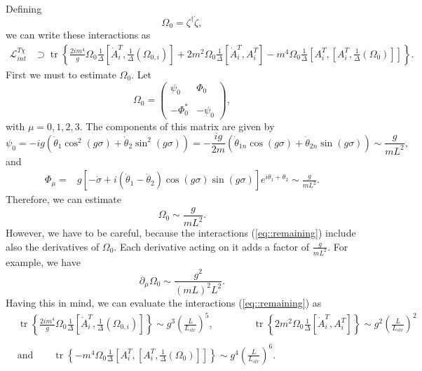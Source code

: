 \documentclass{article}
\DeclareMathOperator{\tr}{tr}
\begin{document}
Defining 
\begin{equation}
    \Omega_0=\zeta^{\dagger}\dot{\zeta},
\end{equation}
we can write these interactions as
\begin{equation}\label{eq::remaining}
\begin{split}
    \mathcal{L}^{T\chi}_{int}&\supset\tr\left\{\frac{2im^4}{g}\Omega_0\frac{1}{\Delta}\left[\dot{A}_i^T,\frac{1}{\Delta}\left(\Omega_{0,i}\right)\right]+2m^2\Omega_0\frac{1}{\Delta}\left[\dot{A}_i^T,A_i^T\right]-m^4\Omega_0\frac{1}{\Delta}\left[A_i^T,\left[A_i^T,\frac{1}{\Delta}\left(\Omega_0\right)\right]\right]\right\}.
    \end{split}
\end{equation}
First we must to estimate $\Omega_{0}$. Let
\begin{equation}
    \Omega_{0}=\begin{pmatrix}
     \psi_{0} & \Phi_{0} \\\\
     -\Phi_{0}^* & -\psi_{0} 
\end{pmatrix},
\end{equation}
with $\mu=0,1,2,3$. The components of this matrix are given by  
\begin{equation}
    \psi_{0}=-ig(\dot{\theta}_1\cos^2(g\sigma)+\dot{\theta}_2\sin^2(g\sigma))=-\frac{ig}{2m}(\dot{\theta}_{1n}\cos(g\sigma)+\dot{\theta}_{2n}\sin(g\sigma))\sim\frac{g}{mL^2},
\end{equation}
and
\begin{equation}
    \begin{split}
        \Phi_{\mu}=&g[-\dot{\sigma}+i(\dot{\theta}_1-\dot{\theta}_2)\cos(g\sigma)\sin(g\sigma)]e^{i\theta_1+\theta_2}\sim\frac{g}{mL^2}.
    \end{split}
\end{equation}
Therefore, we can estimate 
\begin{equation}
    \Omega_{0}\sim\frac{g}{mL^2}.
\end{equation}
However, we have to be careful, because the interactions (\ref{eq::remaining}) include also the derivatives of $\Omega_{0}$.
Each derivative acting on it adds a factor of $\frac{g}{mL^2}$. For example, we have
\begin{equation}
    \partial_{\mu}\Omega_0\sim\frac{g^2}{\left(mL\right)^2L^2}.
\end{equation}
 Having this in mind, we can evaluate the interactions (\ref{eq::remaining}) as 
 \begin{equation}
 \begin{split}
     &\tr\left\{\frac{2im^4}{g}\Omega_0\frac{1}{\Delta}\left[\dot{A}_i^T,\frac{1}{\Delta}\left(\Omega_{0,i}\right)\right]\right\}\sim g^3\left(\frac{L}{L_{str}}\right)^5,\qquad\qquad \tr\left\{2m^2\Omega_0\frac{1}{\Delta}\left[\dot{A}_i^T,A_i^T\right]\right\}\sim g^2\left(\frac{L}{L_{str}}\right)^2\\\\
    &\text{and}\qquad \tr\left\{-m^4\Omega_0\frac{1}{\Delta}\left[A_i^T,\left[A_i^T,\frac{1}{\Delta}\left(\Omega_0\right)\right]\right]\right\}\sim g^4\left(\frac{L}{L_{str}}\right)^6.
 \end{split}
 \end{equation}
\end{document}
